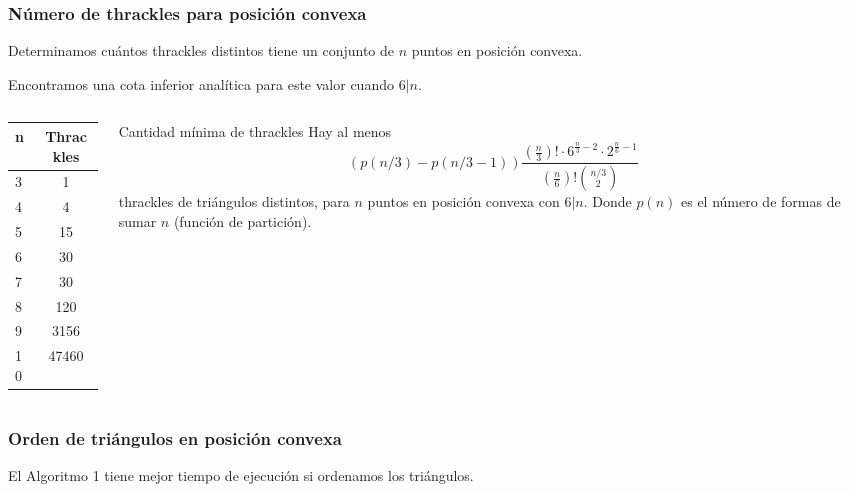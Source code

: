\documentclass{beamer}
\begin{document}
\begin{frame}
  \frametitle{Número de thrackles para posición convexa}
  Determinamos cuántos thrackles distintos tiene un conjunto de $n$ puntos en
  posición convexa.

  Encontramos una cota inferior analítica para este valor cuando $6|n$.\\
  \begin{columns}
    \begin{column}{0.3\textwidth}
      \begin{center}
        \begin{tabular}{| l | c |}
          \hline
          \textbf{n} & \textbf{Thrackles} \\ \hline
          3 & 1 \\ \hline 
          4 & 4 \\ \hline
          5 & 15 \\ \hline
          6 & 30 \\ \hline
          7 & 30 \\ \hline
          8 & 120 \\ \hline
          9 & 3156 \\ \hline
          10 & 47460 \\ \hline
        \end{tabular}
      \end{center}
    \end{column}
    \begin{column}{0.7\textwidth}
      \begin{block}{Cantidad mínima de thrackles}
        Hay al menos
        $$(p(n/3)-p(n/3-1))\frac{(\frac{n}{3})!\cdot6^{\frac{n}{3}-2}\cdot2^{\frac{n}{6}-1}}{(\frac{n}{6})!\binom{n/3}{2}}$$
        thrackles de triángulos distintos, para $n$ puntos en posición
        convexa con $6|n$. Donde $p(n)$ es el número de formas de sumar $n$
        (función de partición).
      \end{block}
    \end{column}
  \end{columns}
\end{frame}

\begin{frame}
  \frametitle{Orden de triángulos en posición convexa}
  El Algoritmo 1 tiene mejor tiempo de ejecución si ordenamos los triángulos.
  \begin{figure}[htb]
    \centering
    
  \end{figure}
\end{frame}
\end{document}
